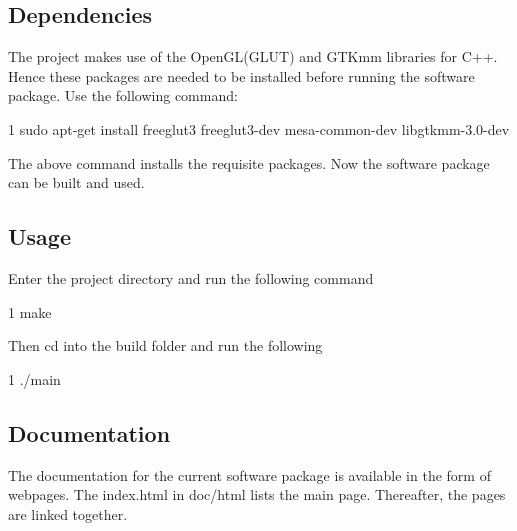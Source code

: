 \subsection*{Dependencies}

The project makes use of the Open\+G\+L(\+G\+L\+U\+T) and G\+T\+Kmm libraries for C++. Hence these packages are needed to be installed before running the software package. Use the following command\+: 
\begin{DoxyCode}
1 sudo apt-get install freeglut3 freeglut3-dev mesa-common-dev libgtkmm-3.0-dev
\end{DoxyCode}
 The above command installs the requisite packages. Now the software package can be built and used.

\subsection*{Usage}

Enter the project directory and run the following command 
\begin{DoxyCode}
1 make
\end{DoxyCode}
 Then cd into the build folder and run the following 
\begin{DoxyCode}
1 ./main
\end{DoxyCode}


\subsection*{Documentation}

The documentation for the current software package is available in the form of webpages. The index.\+html in doc/html lists the main page. Thereafter, the pages are linked together. 